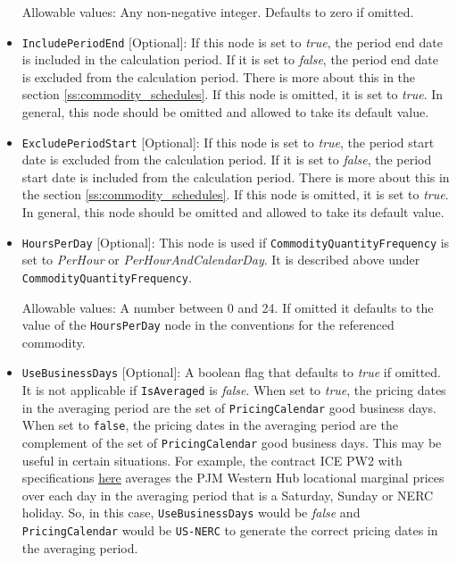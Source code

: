 \begin{itemize}
Allowable values: Any non-negative integer. Defaults to zero if omitted. 

\item
\lstinline!IncludePeriodEnd! [Optional]: If this node is set to \emph{true}, the period end date is included in the calculation period. If it is set to \emph{false}, the period end date is excluded from the calculation period. There is more about this in the section \ref{ss:commodity_schedules}. If this node is omitted, it is set to \emph{true}. In general, this node should be omitted and allowed to take its default value.

\item
\lstinline!ExcludePeriodStart! [Optional]: If this node is set to \emph{true}, the period start date is excluded from the calculation period. If it is set to \emph{false}, the period start date is included from the calculation period. There is more about this in the section \ref{ss:commodity_schedules}. If this node is omitted, it is set to \emph{true}. In general, this node should be omitted and allowed to take its default value.

\item
\lstinline!HoursPerDay! [Optional]: This node is used if \lstinline!CommodityQuantityFrequency! is set to \emph{PerHour} or \emph{PerHourAndCalendarDay}. It is described above under \lstinline!CommodityQuantityFrequency!. 

Allowable values: A number between 0 and 24. If omitted it defaults to the value of the \lstinline!HoursPerDay! node  in the conventions for the referenced commodity.

\item
\lstinline!UseBusinessDays! [Optional]: A boolean flag that defaults to \emph{true} if omitted. It is not applicable if \lstinline!IsAveraged! is \emph{false}. When set to \emph{true}, the pricing dates in the averaging period are the set of \lstinline!PricingCalendar! good business days. When set to \lstinline!false!, the pricing dates in the averaging period are the complement of the set of \lstinline!PricingCalendar! good business days. This may be useful in certain situations. For example, the contract ICE PW2 with specifications \href{https://www.theice.com/products/71090520/PJM-Western-Hub-Real-Time-Peak-2x16-Fixed-Price-Future}{here} averages the PJM Western Hub locational marginal prices over each day in the averaging period that is a Saturday, Sunday or NERC holiday. So, in this case, \lstinline!UseBusinessDays! would be \emph{false} and \lstinline!PricingCalendar! would be \lstinline!US-NERC! to generate the correct pricing dates in the averaging period.


\end{itemize}
